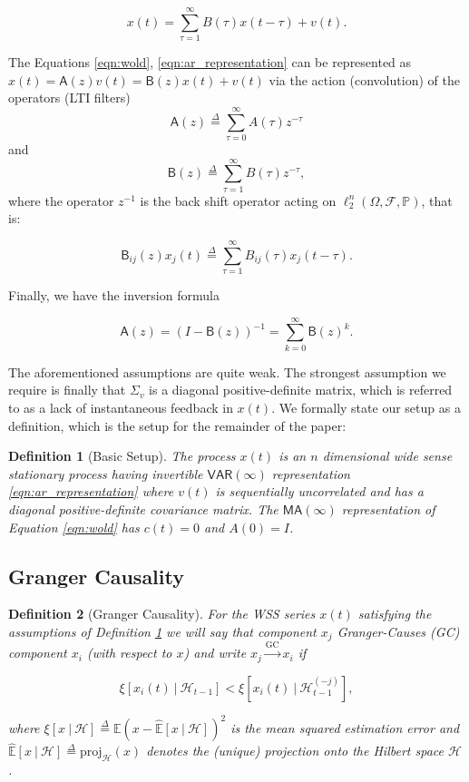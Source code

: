 \documentclass{statsoc}
\def\gc{\overset{\text{GC}}{\rightarrow}}  %
\def\VAR{\mathsf{VAR}}  %
\def\MA{\mathsf{MA}}  %
\def\B{\mathsf{B}}  %
\def\A{\mathsf{A}}  %
\def\H{\mathcal{H}}  %
\newcommand{\linE}[2]{\hat{\E}[#1\ |\ #2]}  %
\newcommand{\linEerr}[2]{\xi[#1\ |\ #2]}  %
\newtheorem{definition}{Definition}
\def\defeq{\overset{\Delta}{=}}  %
\def\H{\mathcal{H}}  %
\def\E{\mathbb{E}}  %
\begin{document}
\begin{equation}
  \label{eqn:ar_representation}
  x(t) = \sum_{\tau = 1}^\infty B(\tau) x(t - \tau) + v(t).
\end{equation}

The Equations \eqref{eqn:wold}, \eqref{eqn:ar_representation} can be
represented as $x(t) = \A(z)v(t) = \B(z)x(t) + v(t)$ via the action
(convolution) of the operators (LTI filters)
$$\A(z) \defeq \sum_{\tau = 0}^\infty A(\tau)z^{-\tau}$$ and
$$\B(z) \defeq \sum_{\tau = 1}^\infty B(\tau)z^{-\tau},$$ where the
operator $z^{-1}$ is the back shift operator acting on
$\ell_2^n(\Omega, \mathcal{F}, \mathbb{P})$, that is:

\begin{equation}
  \label{eqn:filter_action}
  \B_{ij}(z)x_j(t) \defeq \sum_{\tau = 1}^\infty B_{ij}(\tau)x_j(t - \tau).
\end{equation}

Finally, we have the inversion formula

\begin{equation}
  \label{eqn:lsi_inversion}
  \A(z) = (I - \B(z))^{-1} = \sum_{k = 0}^\infty \B(z)^k.
\end{equation}

The aforementioned assumptions are quite weak.  The strongest
assumption we require is finally that $\Sigma_v$ is a diagonal
positive-definite matrix, which is referred to as a lack of
instantaneous feedback in $x(t)$.  We formally state our setup as a
definition, which is the setup for the remainder of the paper:

\begin{definition}[Basic Setup]
  \label{def:basic_setup}
  The process $x(t)$ is an $n$ dimensional wide sense stationary
  process having invertible $\VAR(\infty)$ representation
  \eqref{eqn:ar_representation} where $v(t)$ is sequentially
  uncorrelated and has a diagonal positive-definite covariance matrix.
  The $\MA(\infty)$ representation of Equation \eqref{eqn:wold} has
  $c(t) = 0$ and $A(0) = I$.
\end{definition}

\subsection{Granger Causality}

\begin{definition}[Granger Causality]
  \label{def:granger_causality}
  For the WSS series $x(t)$ satisfying the assumptions of Definition
  \ref{def:basic_setup} we will say that component $x_j$
  \textit{Granger-Causes} (GC) component $x_i$ (with respect to $x$)
  and write $x_j \gc x_i$ if

\begin{equation}
  \linEerr{x_i(t)}{\H_{t - 1}} < \linEerr{x_i(t)}{\H^{(-j)}_{t - 1}},
\end{equation}

where $\xi[x \ |\ \H] \defeq \E (x - \linE{x}{\H})^2$ is the mean
squared estimation error and $\linE{x}{\H} \defeq \text{proj}_{\H}(x)$
denotes the (unique) projection onto the Hilbert space $\H$.
\end{definition}
\end{document}
